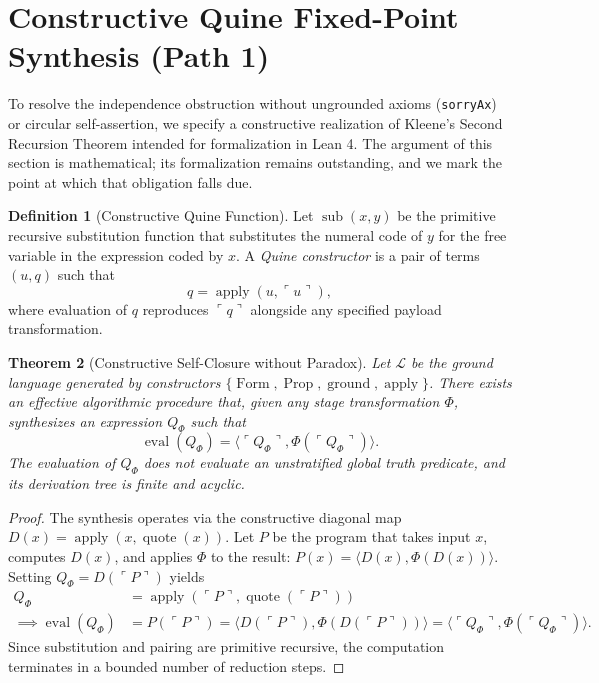 \documentclass[11pt]{article}
\newtheorem{theorem}{Theorem}[section]
\theoremstyle{definition}
\newtheorem{definition}[theorem]{Definition}
\newcommand{\code}[1]{\ulcorner #1\urcorner}
\begin{document}
\section{Constructive Quine Fixed-Point Synthesis (Path 1)}
To resolve the independence obstruction without ungrounded axioms (\texttt{sorryAx}) or circular self-assertion, we specify a constructive realization of Kleene's Second Recursion Theorem intended for formalization in Lean 4. The argument of this section is mathematical; its formalization remains outstanding, and we mark the point at which that obligation falls due.

\begin{definition}[Constructive Quine Function]
Let $\operatorname{sub}(x, y)$ be the primitive recursive substitution function that substitutes the numeral code of $y$ for the free variable in the expression coded by $x$. A \emph{Quine constructor} is a pair of terms $(u, q)$ such that
\[
q = \operatorname{apply}(u, \code{u}),
\]
where evaluation of $q$ reproduces $\code{q}$ alongside any specified payload transformation.
\end{definition}

\begin{theorem}[Constructive Self-Closure without Paradox]
Let $\mathcal{L}$ be the ground language generated by constructors $\{\operatorname{Form}, \operatorname{Prop}, \operatorname{ground}, \operatorname{apply}\}$. There exists an effective algorithmic procedure that, given any stage transformation $\Phi$, synthesizes an expression $Q_\Phi$ such that
\[
\operatorname{eval}(Q_\Phi) = \langle \code{Q_\Phi}, \Phi(\code{Q_\Phi}) \rangle.
\]
The evaluation of $Q_\Phi$ does not evaluate an unstratified global truth predicate, and its derivation tree is finite and acyclic.
\end{theorem}
\begin{proof}
The synthesis operates via the constructive diagonal map $D(x) = \operatorname{apply}(x, \operatorname{quote}(x))$. Let $P$ be the program that takes input $x$, computes $D(x)$, and applies $\Phi$ to the result: $P(x) = \langle D(x), \Phi(D(x)) \rangle$. Setting $Q_\Phi = D(\code{P})$ yields
\begin{align*}
Q_\Phi &= \operatorname{apply}(\code{P}, \operatorname{quote}(\code{P})) \\
\implies \operatorname{eval}(Q_\Phi) &= P(\code{P}) = \langle D(\code{P}), \Phi(D(\code{P})) \rangle = \langle \code{Q_\Phi}, \Phi(\code{Q_\Phi}) \rangle.
\end{align*}
Since substitution and pairing are primitive recursive, the computation terminates in a bounded number of reduction steps.
\end{proof}
\end{document}
